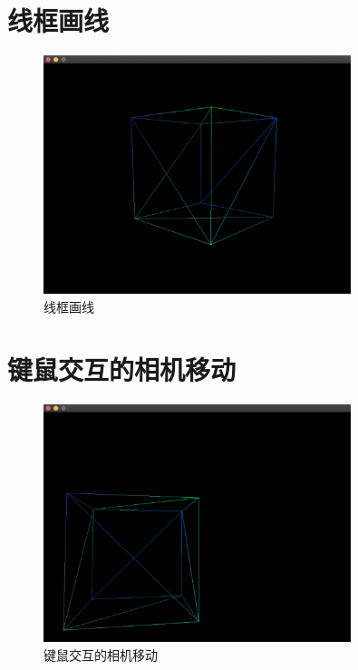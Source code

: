     \section{线框画线}
    
        	\begin{figure}[H]
    	\centering
		\includegraphics[width=0.8\textwidth]{images/demo3.png}
		\caption{线框画线}
		\label{demo3}
    \end{figure}  
    
    \section{键鼠交互的相机移动}
    
            	\begin{figure}[H]
    	\centering
		\includegraphics[width=0.8\textwidth]{images/demo4.png}
		\caption{键鼠交互的相机移动}
		\label{demo4}
    \end{figure}  
    
